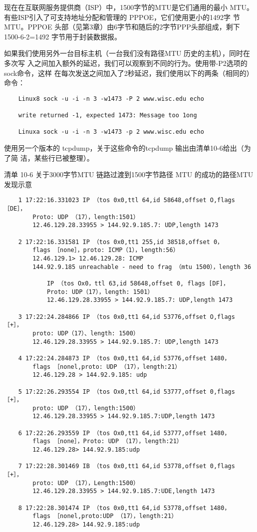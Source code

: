 \begin{tcolorbox}
  现在在互联网服务提供商（ISP）中，1500字节的MTU是它们通用的最小
  MTU。有些ISP引入了可支持地址分配和管理的 PPPOE，它们使用更小的1492字
  节MTU。PPPOE 头部（见第3章）由6字节和随后的2字节PPP头部组成，剩下
  1500-6-2=1492 字节用于封装数据报。
\end{tcolorbox}

如果我们使用另外一台目标主机（一台我们没有路径MTU 历史的主机），同时在多次写
入之间加入额外的延迟，我们可以观察到不同的行为。使用带-P2选项的sock命令，这样
在每次发送之间加入了2秒延迟，我们使用以下的两条（相同的）命令：

\begin{verbatim}
    Linux8 sock -u -i -n 3 -w1473 -P 2 www.wisc.edu echo

    write returned -1, expected 1473: Message too 1ong

    Linuxa sock -u -i -n 3 -w1473 -p 2 www.wisc.edu echo
\end{verbatim}

使用另一个版本的 tcpdump，关于这些命令的tcpdump 输出由清单10-6给出（为了简
洁，某些行已被整理）。

清单 10-6 关于3000字节MTU 链路过渡到1500字节路径 MTU 的成功的路径MTU 发现示意

\begin{verbatim}
    1 17:22:16.331023 IP （tos 0x0,ttl 64,id 58648,offset O,flags ［DE］，
        Proto: UDP （17），length:1501）
        12.46.129.28.33955 > 144.92.9.185.7: UDP,length 1473

    2 17:22:16.331581 IP （tos 0x0,tt1 255,id 38518,offset 0，
        flags ［none］，proto: ICMP（1），length:56）
        12.46.129.1> 12.46.129.28: ICMP
        144.92.9.185 unreachable - need to frag （mtu 1500），length 36

            IP （tos Ox0，ttl 63,id 58648,offset 0, flags [DF]，
            Proto: UDP（17），length: 1501）
            12.46.129.28.33955 > 144.92.9.185.7: UDP,length 1473

    3 17:22:24.284866 IP （tos 0x0,tt1 64,id 53776,offset O,flags ［+］，
        proto: UDP（17）、length: 1500）
        12.46.129.28.33955 > 144.92.9.185.7: UDP,length 1473

    4 17:22:24.284873 IP （tos 0x0,tt1 64,id 53776,offset 1480，
        flags ［nonel,proto: UDP （17），length:21）
        12.46.129.28 > 144.92.9.185: udp

    5 17:22:26.293554 IP （tos Ox0,ttl 64,id 53777,offset 0,flags ［+］，
        proto: UDP （17），length:1500）
        12.46.129.28.33955 > 144.92.9.185.7:UDP,length 1473

    6 17:22:26.293559 IP （tos Ox0,tt1 64,id 53777,offset 1480，
        flags ［none］，Proto: UDP （17），length:21）
        12.46.129.28> 144.92.9.185:udp

    7 17:22:28.301469 IB （tos 0x0,tt1 64,id 53778,offset 0,flags ［+］，
        proto: UDP （17），Length:1500）
        12.46.129.28.33955 > 144.92.9.185.7:UDE,length 1473

    8 17:22:28.301474 IP （tos 0x0,tt1 64,id 53778,offset 1480，
        flags ［nonel,proto:UDP （17），length:21）
        12.46.129.28> 144.92.9.185:udp
\end{verbatim}

